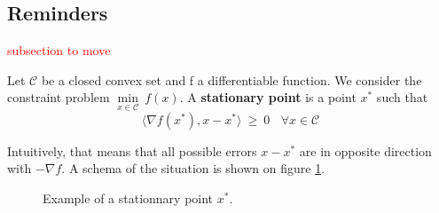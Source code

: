 %
%
%
%
%
%

\subsection{Reminders}
\textcolor{red}{subsection to move}

\begin{definition}
Let $\mathcal{C}$ be a closed convex set and f a differentiable function. We consider the constraint problem $\underset{x\in \mathcal{C}}{\min}\ f(x)$. A \textbf{stationary point} is a point $x^*$ such that
\begin{equation*}
\langle \nabla f(x^*), x-x^* \rangle \ \geq\ 0 \ \ \ \ \forall x \in \mathcal{C}
\end{equation*}
\end{definition}

Intuitively, that means that all possible errors $x-x^*$ are in opposite direction with $-\nabla f$. A schema of the situation is shown on figure \ref{tik1}.
\begin{figure}[H]
\centering
{}
\caption{Example of a stationnary point $x^*$.}
\label {tik1}
\end{figure}

